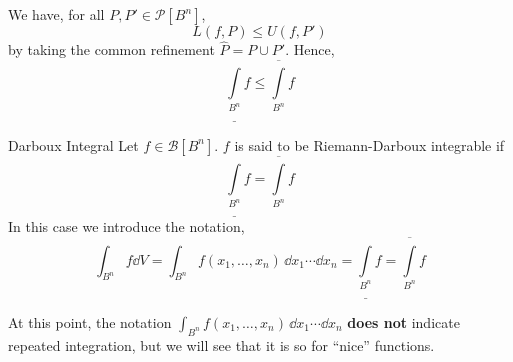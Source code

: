 \documentclass[../Analysis-3.tex]{subfiles}
\begin{document}
We have, for all \( P, P' \in \mathcal{P}[B^n] \),
\[
  L(f, P) \leq U(f, P')
\]
by taking the common refinement \( \widehat{P} = P \cup P' \). Hence,
\[
  \underline{\int \limits _{B^n}} f \leq \overline{\int \limits _{B^n}} f
\]

\begin{Def}{Darboux Integral}{}
  Let \( f \in \mathcal{B}[B^n] \). \( f \) is said to be Riemann-Darboux integrable if
  \[
    \underline{\int \limits _{B^n}} f = \overline{\int \limits _{B^n}} f
  \]
  In this case we introduce the notation,
  \[
    \int_{B^n} f \dd V = \int_{B^n} f(x_1, \dots, x_n) \, \dd x_1 \cdots \dd x_n = \underline{\int \limits _{B^n}} f = \overline{\int \limits _{B^n}} f
  \]
\end{Def}
At this point, the notation \( \int_{B^n} f(x_1, \dots, x_n) \, \dd x_1 \cdots \dd x_n \) \textbf{does not} indicate repeated integration, but we will see that it is so for ``nice'' functions.
\end{document}
